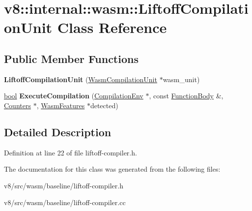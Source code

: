 \hypertarget{classv8_1_1internal_1_1wasm_1_1LiftoffCompilationUnit}{}\section{v8\+:\+:internal\+:\+:wasm\+:\+:Liftoff\+Compilation\+Unit Class Reference}
\label{classv8_1_1internal_1_1wasm_1_1LiftoffCompilationUnit}
\subsection*{Public Member Functions}
\begin{DoxyCompactItemize}
\item 
\mbox{\label{classv8_1_1internal_1_1wasm_1_1LiftoffCompilationUnit_ab6304f49a67c1e360cffd4ef2adb45f0}} 
{\bfseries Liftoff\+Compilation\+Unit} (\mbox{\hyperlink{classv8_1_1internal_1_1wasm_1_1WasmCompilationUnit}{Wasm\+Compilation\+Unit}} $\ast$wasm\+\_\+unit)
\item 
\mbox{\label{classv8_1_1internal_1_1wasm_1_1LiftoffCompilationUnit_a0dcb248290dab06eacddd8f4bcbb7c65}} 
\mbox{\hyperlink{classbool}{bool}} {\bfseries Execute\+Compilation} (\mbox{\hyperlink{structv8_1_1internal_1_1wasm_1_1CompilationEnv}{Compilation\+Env}} $\ast$, const \mbox{\hyperlink{structv8_1_1internal_1_1wasm_1_1FunctionBody}{Function\+Body}} \&, \mbox{\hyperlink{classv8_1_1internal_1_1Counters}{Counters}} $\ast$, \mbox{\hyperlink{structv8_1_1internal_1_1wasm_1_1WasmFeatures}{Wasm\+Features}} $\ast$detected)
\end{DoxyCompactItemize}


\subsection{Detailed Description}


Definition at line 22 of file liftoff-\/compiler.\+h.



The documentation for this class was generated from the following files\+:\begin{DoxyCompactItemize}
\item 
v8/src/wasm/baseline/liftoff-\/compiler.\+h\item 
v8/src/wasm/baseline/liftoff-\/compiler.\+cc\end{DoxyCompactItemize}
